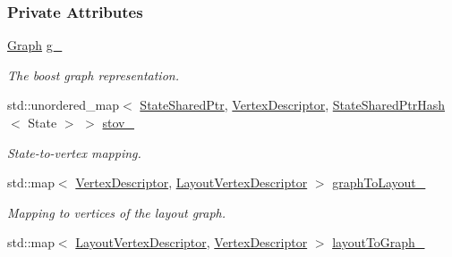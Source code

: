 \subsubsection*{Private Attributes}
\begin{DoxyCompactItemize}
\item 
\hyperlink{structStateGraph_a150e6f41e378ed1d2d78967244a23a68}{Graph} \hyperlink{structStateGraph_abd682c00797a135df3714e87c15b8288}{g\+\_\+}\hypertarget{structStateGraph_abd682c00797a135df3714e87c15b8288}{}\label{structStateGraph_abd682c00797a135df3714e87c15b8288}

\begin{DoxyCompactList}\small\item\em The boost graph representation. \end{DoxyCompactList}\item 
std\+::unordered\+\_\+map$<$ \hyperlink{structStateGraph_a891fe4273003d7714f397f0d5dbae964}{State\+Shared\+Ptr}, \hyperlink{structStateGraph_a95d7ea26b0d0d07d3488068a8e9be53c}{Vertex\+Descriptor}, \hyperlink{structStateSharedPtrHash}{State\+Shared\+Ptr\+Hash}$<$ State $>$ $>$ \hyperlink{structStateGraph_a0195b77b21057be403d5dd8a7ccb68f9}{stov\+\_\+}\hypertarget{structStateGraph_a0195b77b21057be403d5dd8a7ccb68f9}{}\label{structStateGraph_a0195b77b21057be403d5dd8a7ccb68f9}

\begin{DoxyCompactList}\small\item\em State-\/to-\/vertex mapping. \end{DoxyCompactList}\item 
std\+::map$<$ \hyperlink{structStateGraph_a95d7ea26b0d0d07d3488068a8e9be53c}{Vertex\+Descriptor}, \hyperlink{structStateGraph_addf3dd025129b447de51b59254933697}{Layout\+Vertex\+Descriptor} $>$ \hyperlink{structStateGraph_a496a630fbf095a4d0393fe0d7999c41f}{graph\+To\+Layout\+\_\+}\hypertarget{structStateGraph_a496a630fbf095a4d0393fe0d7999c41f}{}\label{structStateGraph_a496a630fbf095a4d0393fe0d7999c41f}

\begin{DoxyCompactList}\small\item\em Mapping to vertices of the layout graph. \end{DoxyCompactList}\item 
std\+::map$<$ \hyperlink{structStateGraph_addf3dd025129b447de51b59254933697}{Layout\+Vertex\+Descriptor}, \hyperlink{structStateGraph_a95d7ea26b0d0d07d3488068a8e9be53c}{Vertex\+Descriptor} $>$ \hyperlink{structStateGraph_a86a625966238d11452f183292755a652}{layout\+To\+Graph\+\_\+}\hypertarget{structStateGraph_a86a625966238d11452f183292755a652}{}\label{structStateGraph_a86a625966238d11452f183292755a652}


\end{DoxyCompactItemize}
